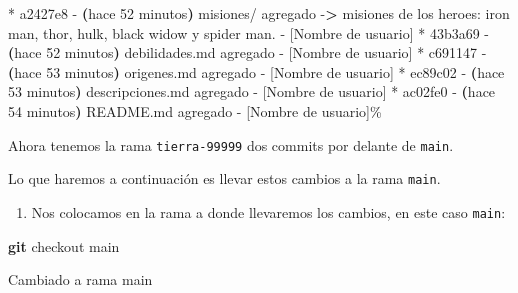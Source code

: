 \documentclass[
]{book}
\newenvironment{Shaded}{\begin{snugshade}}{\end{snugshade}}
\newcommand{\AttributeTok}[1]{\textcolor[rgb]{0.13,0.29,0.53}{#1}}
\newcommand{\ErrorTok}[1]{\textcolor[rgb]{0.64,0.00,0.00}{\textbf{#1}}}
\newcommand{\ExtensionTok}[1]{#1}
\newcommand{\FunctionTok}[1]{\textcolor[rgb]{0.13,0.29,0.53}{\textbf{#1}}}
\newcommand{\KeywordTok}[1]{\textcolor[rgb]{0.13,0.29,0.53}{\textbf{#1}}}
\newcommand{\NormalTok}[1]{#1}
\newcommand{\OperatorTok}[1]{\textcolor[rgb]{0.81,0.36,0.00}{\textbf{#1}}}
\newcommand{\StringTok}[1]{\textcolor[rgb]{0.31,0.60,0.02}{#1}}
\providecommand{\tightlist}{%
  \setlength{\itemsep}{0pt}\setlength{\parskip}{0pt}}
\begin{document}
\begin{Shaded}
\begin{Highlighting}[]
\ExtensionTok{*}\NormalTok{ a2427e8 }\AttributeTok{{-}} \ErrorTok{(}\ExtensionTok{hace}\NormalTok{ 52 minutos}\KeywordTok{)} \ExtensionTok{misiones/}\NormalTok{ agregado }\AttributeTok{{-}}\OperatorTok{\textgreater{}}\NormalTok{ misiones de los heroes: iron man, thor, hulk, black widow y spider man. }\AttributeTok{{-}}\NormalTok{ [Nombre de usuario]}
\ExtensionTok{*}\NormalTok{ 43b3a69 }\AttributeTok{{-}} \ErrorTok{(}\ExtensionTok{hace}\NormalTok{ 52 minutos}\KeywordTok{)} \ExtensionTok{debilidades.md}\NormalTok{ agregado }\AttributeTok{{-}}\NormalTok{ [Nombre de usuario]}
\ExtensionTok{*}\NormalTok{ c691147 }\AttributeTok{{-}} \ErrorTok{(}\ExtensionTok{hace}\NormalTok{ 53 minutos}\KeywordTok{)} \ExtensionTok{origenes.md}\NormalTok{ agregado }\AttributeTok{{-}}\NormalTok{ [Nombre de usuario]}
\ExtensionTok{*}\NormalTok{ ec89c02 }\AttributeTok{{-}} \ErrorTok{(}\ExtensionTok{hace}\NormalTok{ 53 minutos}\KeywordTok{)} \ExtensionTok{descripciones.md}\NormalTok{ agregado }\AttributeTok{{-}}\NormalTok{ [Nombre de usuario]}
\ExtensionTok{*}\NormalTok{ ac02fe0 }\AttributeTok{{-}} \ErrorTok{(}\ExtensionTok{hace}\NormalTok{ 54 minutos}\KeywordTok{)} \ExtensionTok{README.md}\NormalTok{ agregado }\AttributeTok{{-}}\NormalTok{ [Nombre de usuario]\%   }
\end{Highlighting}
\end{Shaded}

Ahora tenemos la rama \texttt{tierra-99999} dos commits por delante de \texttt{main}.

Lo que haremos a continuación es llevar estos cambios a la rama \texttt{main}.

\begin{enumerate}
\def\labelenumi{\arabic{enumi}.}
\setcounter{enumi}{8}
\tightlist
\item
  Nos colocamos en la rama a donde llevaremos los cambios, en este caso \texttt{main}:
\end{enumerate}

\begin{Shaded}
\begin{Highlighting}[]
\FunctionTok{git}\NormalTok{ checkout main}
\end{Highlighting}
\end{Shaded}

\begin{Shaded}
\begin{Highlighting}[]
\ExtensionTok{Cambiado}\NormalTok{ a rama }\StringTok{\textquotesingle{}main\textquotesingle{}}
\end{Highlighting}
\end{Shaded}
\end{document}
